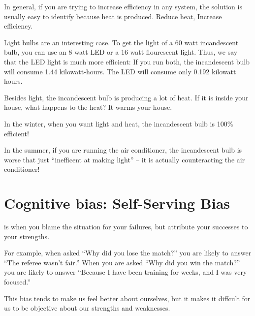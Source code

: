 In general, if you are trying to increase efficiency in any system,
the solution is usually easy to identify because heat is produced. Reduce heat, Increase efficiency.

Light bulbs are an interesting case. To get the light of a 60 watt
incandescent bulb, you can use an 8 watt LED or a 16 watt flourescent
light. Thus, we say that the LED light is much more efficient: If you
run both, the incandescent bulb will consume 1.44 kilowatt-hours. The
LED will consume only 0.192 kilowatt hours.

Besides light, the incandescent bulb is producing a lot of heat. If it
is inside your house, what happens to the heat? It warms your house.

In the winter, when you want light and heat, the incandescent bulb is
100\% efficient!

In the summer, if you are running the air conditioner, the
incandescent bulb is worse that just ``inefficent at making light'' --
it is actually counteracting the air conditioner! 

\section{Cognitive bias: Self-Serving Bias}

 is when you blame the situation for your
failures, but attribute your successes to your strengths.

For example, when asked ``Why did you lose the match?'' you are likely
to answer ``The referee wasn't fair.''  When you are asked ``Why did
you win the match?'' you are likely to answer ``Because I have been
training for weeks, and I was very focused.''

This bias tends to make us feel better about ourselves, but it makes it
diffcult for us to be objective about our strengths and weaknesses.

